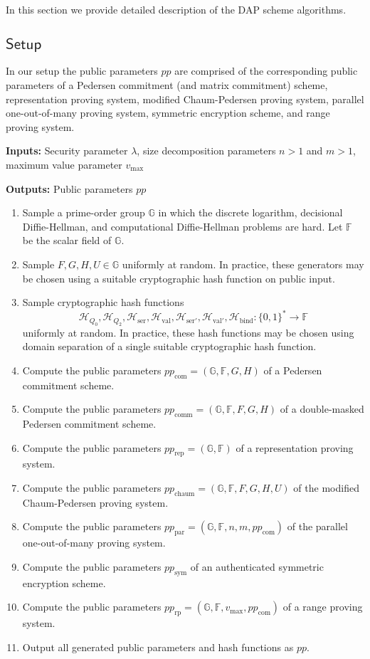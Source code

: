 \documentclass{llncs}
\newcommand{\G}{\mathbb{G}}
\newcommand{\F}{\mathbb{F}}
\newcommand{\hash}{\mathcal{H}}
\newcommand{\func}[1]{\mathsf{#1}}
\begin{document}
In this section we provide detailed description of the DAP scheme algorithms.


\subsection{\texorpdfstring{$\func{Setup}$}{Setup}}

In our setup the public parameters $pp$ are comprised of the corresponding public parameters of a Pedersen commitment (and matrix commitment) scheme, representation proving system, modified Chaum-Pedersen proving system, parallel one-out-of-many proving system, symmetric encryption scheme, and range proving system.

\textbf{Inputs:} Security parameter $\lambda$, size decomposition parameters $n > 1$ and $m > 1$, maximum value parameter $v_{\text{max}}$

\textbf{Outputs:} Public parameters $pp$

\begin{enumerate}
\item Sample a prime-order group $\G$ in which the discrete logarithm, decisional Diffie-Hellman, and computational Diffie-Hellman problems are hard.
Let $\F$ be the scalar field of $\G$.
\item Sample $F,G,H,U \in \G$ uniformly at random.
In practice, these generators may be chosen using a suitable cryptographic hash function on public input.
\item Sample cryptographic hash functions $$\hash_{Q_0},\hash_{Q_2},\hash_{\text{ser}},\hash_{\text{val}},\hash_{\text{ser}'},\hash_{\text{val}'},\hash_{\text{bind}}: \{0,1\}^* \to \F$$ uniformly at random.
In practice, these hash functions may be chosen using domain separation of a single suitable cryptographic hash function.
\item Compute the public parameters $pp_{\text{com}} = (\G,\F,G,H)$ of a Pedersen commitment scheme.
\item Compute the public parameters $pp_{\text{comm}} = (\G,\F,F,G,H)$ of a double-masked Pedersen commitment scheme.
\item Compute the public parameters $pp_{\text{rep}} = (\G,\F)$ of a representation proving system.
\item Compute the public parameters $pp_{\text{chaum}} = (\G,\F,F,G,H,U)$ of the modified Chaum-Pedersen proving system.
\item Compute the public parameters $pp_{\text{par}} = (\G,\F,n,m,pp_{\text{com}})$ of the parallel one-out-of-many proving system.
\item Compute the public parameters $pp_{\text{sym}}$ of an authenticated symmetric encryption scheme.
\item Compute the public parameters $pp_{\text{rp}} = (\G,\F,v_{\text{max}},pp_{\text{com}})$ of a range proving system.
\item Output all generated public parameters and hash functions as $pp$.
\end{enumerate}
\end{document}
